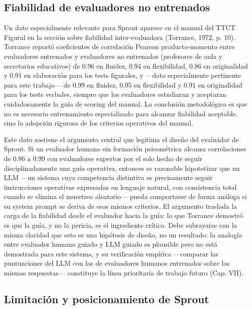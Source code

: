 \documentclass[12pt,twoside,titlepage]{report}
\begin{document}
\subsection{Fiabilidad de evaluadores no entrenados}

Un dato especialmente relevante para Sprout aparece en el manual del TTCT Figural en la sección sobre fiabilidad inter-evaluadora (Torrance, 1972, p. 10). Torrance reportó coeficientes de correlación Pearson producto-momento entre evaluadores entrenados y evaluadores no entrenados (profesores de aula y secretarios educativos) de 0.96 en fluidez, 0.94 en flexibilidad, 0.86 en originalidad y 0.91 en elaboración para los tests figurales, y ---dato especialmente pertinente para este trabajo--- de 0.99 en fluidez, 0.95 en flexibilidad y 0.91 en originalidad para los tests verbales, siempre que los evaluadores estudiaran y aceptaran cuidadosamente la guía de scoring del manual. La conclusión metodológica es que no es necesario entrenamiento especializado para alcanzar fiabilidad aceptable, sino la adopción rigurosa de los criterios operativos del manual.

Este dato sostiene el argumento central que legitima el diseño del evaluador de Sprout. Si un evaluador humano sin formación psicométrica alcanza correlaciones de 0.86 a 0.99 con evaluadores expertos por el solo hecho de seguir disciplinadamente una guía operativa, entonces es razonable hipotetizar que un LLM ---un sistema cuya competencia distintiva es precisamente seguir instrucciones operativas expresadas en lenguaje natural, con consistencia total cuando se elimina el muestreo aleatorio--- pueda comportarse de forma análoga si su system prompt se deriva de esos mismos criterios. El argumento traslada la carga de la fiabilidad desde el evaluador hacia la guía: lo que Torrance demostró es que la guía, y no la pericia, es el ingrediente crítico. Debe subrayarse con la misma claridad que esto es una hipótesis de diseño, no un resultado: la analogía entre evaluador humano guiado y LLM guiado es plausible pero no está demostrada para este sistema, y su verificación empírica ---comparar las puntuaciones del LLM con las de evaluadores humanos entrenados sobre las mismas respuestas--- constituye la línea prioritaria de trabajo futuro (Cap. VII).

\subsection{Limitación y posicionamiento de Sprout}
\end{document}
